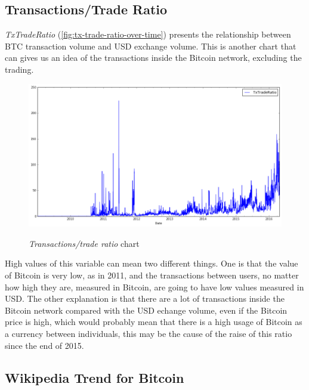 
\subsection{Transactions/Trade Ratio}
\label{sec:tx-trade-ratio}

\textit{TxTradeRatio} (\autoref{fig:tx-trade-ratio-over-time})
presents the relationship between BTC transaction volume and USD
exchange volume. This is another chart that can gives us an idea of
the transactions inside the Bitcoin network, excluding the trading.

\begin{figure}[bth]
  \myfloatalign
  {\includegraphics[width=1\linewidth]
    {gfx/tx-trade-ratio-over-time}}
  \caption{\textit{Transactions/trade ratio} chart}
  \label{fig:tx-trade-ratio-over-time}
\end{figure}


High values of this variable can mean two different things. One is
that the value of Bitcoin is very low, as in 2011, and the
transactions between users, no matter how high they are, measured in
Bitcoin, are going to have low values measured in USD. The other
explanation is that there are a lot of transactions inside the Bitcoin
network compared with the USD echange volume, even if the Bitcoin
price is high, which would probably mean that there is a high usage of
Bitcoin as a currency between individuals, this may be the cause of
the raise of this ratio since the end of 2015.


\subsection{Wikipedia Trend for Bitcoin}
\label{sec:wikipedia-trend-for-bitcoin}

